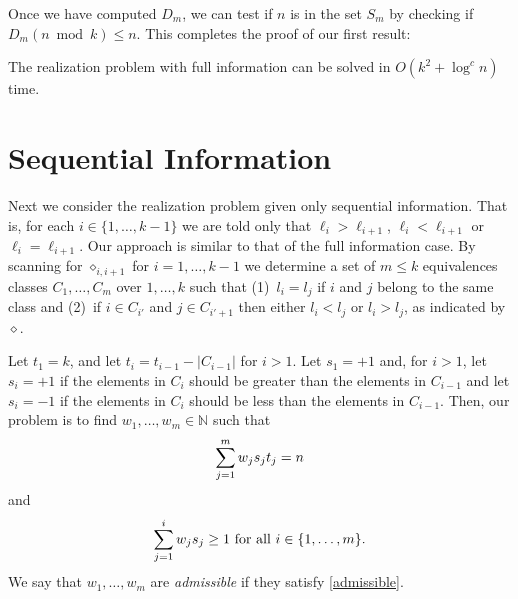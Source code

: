 \documentclass[11pt,a4paper]{article}
\newcommand{\N}{\mathbb{N}}
\newcommand{\op}{\diamond}
\begin{document}
Once we have computed $D_{m}$, we can test if $n$ is in the set $S_m$ by
checking if $D_m(n\bmod k) \le n$.  This completes the proof of our
first result:

\begin{thm}
The realization problem with full information can be solved in
$O(k^2+\log^c n)$ time.
\end{thm}



\section{Sequential Information}

Next we consider the realization problem given only sequential
information.  That is, for each $i\in\{1,\ldots,k-1\}$ we are told
only that $\ell_i > \ell_{i+1}$, $\ell_i < \ell_{i+1}$ or
$\ell_i=\ell_{i+1}$.  Our approach is similar to that of the full
information case.  By scanning for $\op_{i,i+1}$ for $i=1,\ldots,k-1$
we determine a set of $m\le k$ equivalences classes $C_1,\ldots,C_m$
over $1,\ldots,k$ such that (1)~$l_i=l_j$ if $i$ and $j$ belong to the
same class and (2)~if $i\in C_{i'}$ and $j\in C_{i'+1}$ then either
$l_i<l_j$ or $l_i > l_j$, as indicated by $\op$. 

Let $t_1=k$, and let $t_i = t_{i-1}-|C_{i-1}|$ for $i>1$.  Let
$s_1=+1$ and, for $i>1$, let $s_i=+1$ if the elements in $C_{i}$
should be greater than the elements in $C_{i-1}$ and let $s_{i}=-1$ if
the elements in $C_{i}$ should be less than the elements in $C_{i-1}$.
Then, our problem is to find $w_1,\ldots,w_m\in\N$ such
that
\begin{equation}
\sum_{j=1}^m w_js_jt_j = n \eqlabel{sum-n}
\end{equation}
and
\begin{equation}
\sum_{j=1}^i w_js_j \ge 1 \mbox{ for all $i\in\{1,\ldots,m\}$.}
\eqlabel{admissible}
\end{equation}
We say that $w_1,\ldots,w_m$ are \emph{admissible} if they satisfy
\eqref{admissible}.
\end{document}
